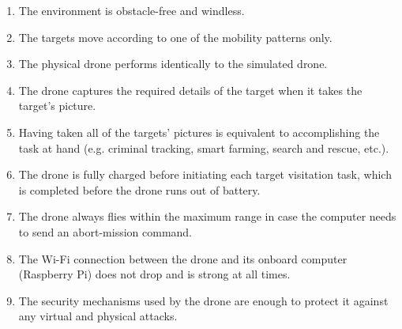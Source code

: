 \documentclass[../main.tex]{subfiles}
\begin{document}
\begin{enumerate}
    \item The environment is obstacle-free and windless.
    \item The targets move according to one 
        of the mobility patterns only.
    \item The physical \anafi drone performs 
        identically to the simulated \anafi drone.
    \item The \anafi drone captures the 
        required details of the target 
        when it takes the target’s picture.
    \item Having taken all of the targets' pictures 
        is equivalent to accomplishing the task at hand 
        (e.g. criminal tracking, smart farming, 
        search and rescue, etc.).
    \item The \anafi drone is fully charged before 
        initiating each target visitation task,
        which is completed before the drone
        runs out of battery.
    \item The \anafi drone always flies within the
        maximum range in case the computer needs
        to send an abort-mission command.
    \item The Wi-Fi connection between the \anafi drone
        and its onboard computer (Raspberry Pi)
        does not drop and is strong at all times.
    \item The security mechanisms used by the \anafi
        drone are enough to protect it against
        any virtual and physical attacks.
\end{enumerate}
\end{document}
